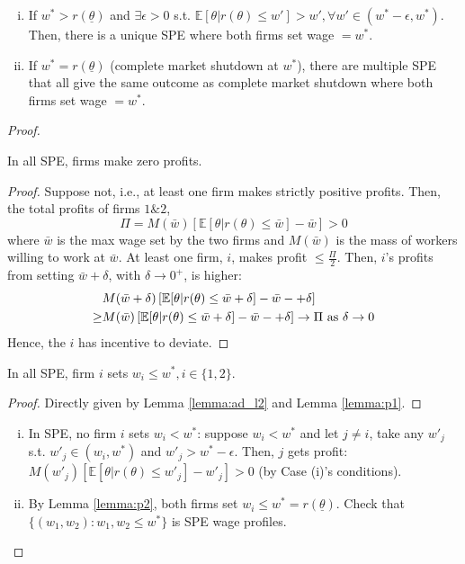 \documentclass[11pt]{elegantbook_2}
\begin{document}
\begin{proposition}
    \begin{enumerate}[(i).]
        \item If $w^*>r(\underline{\theta})$ and $\exists \epsilon>0$ s.t. $\mathbb{E}[\theta|r(\theta)\leq w']>w',\forall w'\in \left(w^*-\epsilon,w^*\right)$. Then, there is a unique SPE where both firms set wage $=w^*$.
        \item If $w^*=r(\underline{\theta})$ (complete market shutdown at $w^*$), there are multiple SPE that all give the same outcome as complete market shutdown where both firms set wage $=w^*$.
    \end{enumerate}
\end{proposition}
\begin{proof}
    \begin{lemma}\label{lemma:p1}
        In all SPE, firms make zero profits.
    \end{lemma}
    \begin{proof}
        Suppose not, i.e., at least one firm makes strictly positive profits. Then, the total profits of firms $1\&2$, $$\Pi=M(\bar{w})\left[\mathbb{E}[\theta|r(\theta)\leq\bar{w}]-\bar{w}\right]>0$$
        where $\bar{w}$ is the max wage set by the two firms and $M(\bar{w})$ is the mass of workers willing to work at $\bar{w}$. At least one firm, $i$, makes profit $\leq\frac{\Pi}{2}$. Then, $i$'s profits from setting $\bar{w}+\delta$, with $\delta \rightarrow 0^+$, is higher:
        \begin{equation}
            \begin{aligned}
                &M(\bar{w}+\delta)\left[\mathbb{E}[\theta|r(\theta)\leq\bar{w}+\delta]-\bar{w}-+\delta\right]\\
                \geq &M(\bar{w})\left[\mathbb{E}[\theta|r(\theta)\leq\bar{w}+\delta]-\bar{w}-+\delta\right] \rightarrow \Pi \textnormal{ as }\delta \rightarrow 0
            \end{aligned}
            \nonumber
        \end{equation}
        Hence, the $i$ has incentive to deviate.
    \end{proof}
    \begin{lemma}\label{lemma:p2}
        In all SPE, firm $i$ sets $w_i\leq w^*, i\in\{1,2\}$.
    \end{lemma}
    \begin{proof}
        Directly given by Lemma \ref{lemma:ad_l2} and Lemma \ref{lemma:p1}.
    \end{proof}
    \begin{enumerate}[(i):]
        \item In SPE, no firm $i$ sets $w_i<w^*$: suppose $w_i<w^*$ and let $j\neq i$, take any $w'_j$ s.t. $w'_j\in\left(w_i,w^*\right)$ and $w'_j>w^*-\epsilon$. Then, $j$ gets profit: $M(w'_j)\left[\mathbb{E}[\theta|r(\theta)\leq w'_j]-w'_j\right]>0$ (by Case (i)'s conditions).
        \item By Lemma \ref{lemma:p2}, both firms set $w_i\leq w^*=r(\underline{\theta})$. Check that $\{(w_1,w_2):w_1,w_2\leq w^*\}$ is SPE wage profiles.
    \end{enumerate}
\end{proof}
\end{document}
